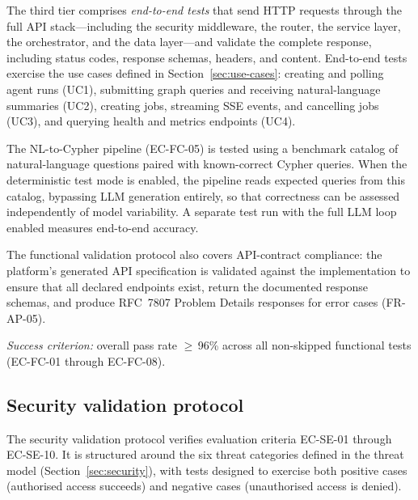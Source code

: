 \documentclass[a4paper,noexaminfo]{sapthesis}
\begin{document}
The third tier comprises \emph{end-to-end tests} that send HTTP requests
through the full API stack---including the security middleware, the
router, the service layer, the orchestrator, and the data layer---and
validate the complete response, including status codes, response
schemas, headers, and content.  End-to-end tests exercise the use
cases defined in Section~\ref{sec:use-cases}: creating and polling agent
runs (UC1), submitting graph queries and receiving natural-language
summaries (UC2), creating jobs, streaming SSE events, and cancelling jobs
(UC3), and querying health and metrics endpoints (UC4).

The NL-to-Cypher pipeline (EC-FC-05) is tested using a benchmark catalog
of natural-language questions paired with known-correct Cypher queries.
When the deterministic test mode is enabled, the pipeline reads expected
queries from this catalog, bypassing LLM generation entirely, so that
correctness can be assessed independently of model variability.  A
separate test run with the full LLM loop enabled measures end-to-end
accuracy.

The functional validation protocol also covers API-contract compliance:
the platform's generated API specification is validated against the
implementation to ensure that all declared endpoints exist, return the
documented response schemas, and produce RFC~7807 Problem Details
responses for error cases (FR-AP-05).

\medskip
\noindent\emph{Success criterion:} overall pass rate $\geq$\,96\%
across all non-skipped functional tests (EC-FC-01 through EC-FC-08).

\subsection{Security validation protocol}
\label{sec:security-protocol}

The security validation protocol verifies evaluation criteria EC-SE-01
through EC-SE-10.  It is structured around the six threat categories
defined in the threat model (Section~\ref{sec:security}), with tests
designed to exercise both positive cases (authorised access succeeds) and
negative cases (unauthorised access is denied).
\end{document}
